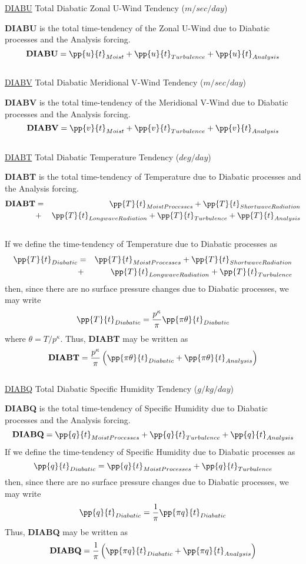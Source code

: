 \noindent
{ \underline {DIABU} Total Diabatic Zonal U-Wind Tendency  ($m/sec/day$) }

\noindent
{\bf DIABU} is the total time-tendency of the Zonal U-Wind due to Diabatic processes
and the Analysis forcing.
\[
{\bf DIABU} = \pp{u}{t}_{Moist} + \pp{u}{t}_{Turbulence} + \pp{u}{t}_{Analysis} 
\]
\\

\noindent
{ \underline {DIABV} Total Diabatic Meridional V-Wind Tendency  ($m/sec/day$) }

\noindent
{\bf DIABV} is the total time-tendency of the Meridional V-Wind due to Diabatic processes
and the Analysis forcing.
\[
{\bf DIABV} = \pp{v}{t}_{Moist} + \pp{v}{t}_{Turbulence} + \pp{v}{t}_{Analysis} 
\]
\\

\noindent
{ \underline {DIABT} Total Diabatic Temperature Tendency  ($deg/day$) }

\noindent
{\bf DIABT} is the total time-tendency of Temperature due to Diabatic processes
and the Analysis forcing.
\begin{eqnarray*}
{\bf DIABT} & = & \pp{T}{t}_{Moist Processes} + \pp{T}{t}_{Shortwave Radiation} \\
           & + & \pp{T}{t}_{Longwave Radiation} + \pp{T}{t}_{Turbulence} + \pp{T}{t}_{Analysis} 
\end{eqnarray*}
\\
If we define the time-tendency of Temperature due to Diabatic processes as
\begin{eqnarray*}
\pp{T}{t}_{Diabatic} & = & \pp{T}{t}_{Moist Processes} + \pp{T}{t}_{Shortwave Radiation} \\
                     & + & \pp{T}{t}_{Longwave Radiation} + \pp{T}{t}_{Turbulence}
\end{eqnarray*}
then, since there are no surface pressure changes due to Diabatic processes, we may write
\[
\pp{T}{t}_{Diabatic} = {p^\kappa \over \pi }\pp{\pi \theta}{t}_{Diabatic}
\]
where $\theta = T/p^\kappa$.  Thus, {\bf DIABT} may be written as
\[
{\bf DIABT} = {p^\kappa \over \pi } \left( \pp{\pi \theta}{t}_{Diabatic} + \pp{\pi \theta}{t}_{Analysis} \right)
\]
\\

\noindent
{ \underline {DIABQ} Total Diabatic Specific Humidity Tendency  ($g/kg/day$) }

\noindent
{\bf DIABQ} is the total time-tendency of Specific Humidity due to Diabatic processes
and the Analysis forcing.
\[
{\bf DIABQ} = \pp{q}{t}_{Moist Processes} + \pp{q}{t}_{Turbulence} + \pp{q}{t}_{Analysis} 
\]
If we define the time-tendency of Specific Humidity due to Diabatic processes as
\[
\pp{q}{t}_{Diabatic} = \pp{q}{t}_{Moist Processes} + \pp{q}{t}_{Turbulence}
\]
then, since there are no surface pressure changes due to Diabatic processes, we may write
\[
\pp{q}{t}_{Diabatic} = {1 \over \pi }\pp{\pi q}{t}_{Diabatic}
\]
Thus, {\bf DIABQ} may be written as
\[
{\bf DIABQ} = {1 \over \pi } \left( \pp{\pi q}{t}_{Diabatic} + \pp{\pi q}{t}_{Analysis} \right)
\]
\\

